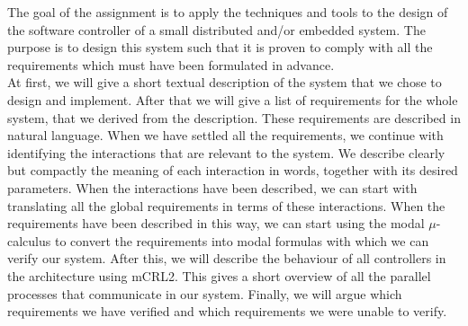 The goal of the assignment is to apply the techniques and tools to the design of the software controller of a small distributed and/or embedded system. The purpose is to design this system such that it is proven to comply with all the requirements which must have been formulated in advance.\\

At first, we will give a short textual description of the system that we chose to design and implement. After that we will give a list of requirements for the whole system, that we derived from the description. These requirements are described in natural language. When we have settled all the requirements, we continue with identifying the interactions that are relevant to the system. We describe clearly but compactly the meaning of each interaction in words, together with its desired parameters. When the interactions have been described, we can start with translating all the global requirements in terms of these interactions. When the requirements have been described in this way, we can start using the modal $\mu$-calculus to convert the requirements into modal formulas with which we can verify our system. After this, we will describe the behaviour of all controllers in the architecture using mCRL2. This gives a short overview of all the parallel processes that communicate in our system. Finally, we will argue which requirements we have verified and which requirements we were unable to verify.